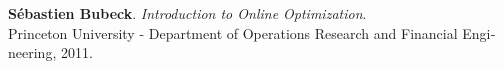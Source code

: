 

\newcommand{\bibauthors}[1]{\textbf{#1}}
\newcommand{\bibtitle}[1]{\textit{#1}}
\newcommand{\bibpublication}[1]{\textnormal{#1}}


\begin{thebibliography}{9}
\begin{latin}

\bibauthors{ S\'ebastien Bubeck}. 
\bibtitle{Introduction to Online Optimization}.\\
\bibpublication{Princeton University - Department of Operations Research and Financial Engineering, 2011.}

 

\end{latin}
\end{thebibliography}